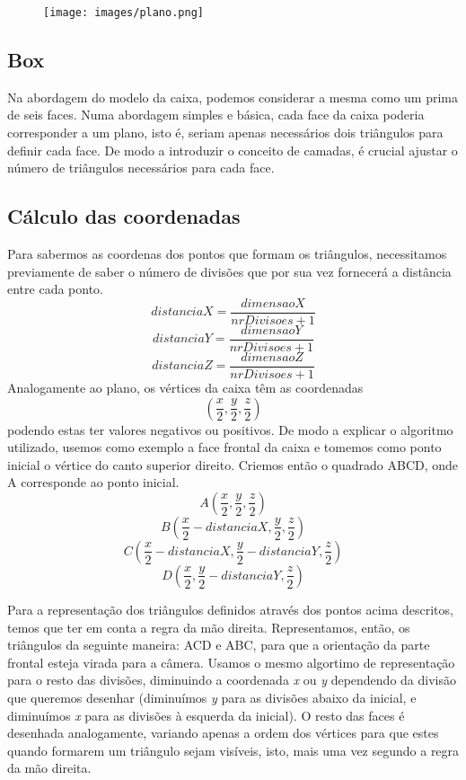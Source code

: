 \Huge\documentclass{article}
\begin{document}
\vspace{0.5cm}

\begin{figure}[h]
\centering
\texttt{[image: images/plano.png]}
\end{figure}

\subsection{Box}
Na abordagem do modelo da caixa, podemos considerar a mesma como um prima de seis faces. Numa abordagem simples e básica, cada face da caixa poderia corresponder a um plano, isto é, seriam apenas necessários dois triângulos para definir cada face. De modo a introduzir o conceito de camadas, é crucial ajustar o número de triângulos necessários para cada face.
\subsection{Cálculo das coordenadas}
Para sabermos as coordenas dos pontos que formam os triângulos, necessitamos previamente de saber o número de divisões que por sua vez fornecerá a distância entre cada ponto.
\[distanciaX = \frac{dimensaoX}{nrDivisoes + 1}\]
\[distanciaY = \frac{dimensaoY}{nrDivisoes + 1}\]
\[distanciaZ = \frac{dimensaoZ}{nrDivisoes + 1}\]
Analogamente ao plano, os vértices da caixa têm as coordenadas
\[(\frac{x}{2}, \frac{y}{2}, \frac{z}{2})\]
podendo estas ter valores negativos ou positivos. De modo a explicar o algoritmo utilizado, usemos como exemplo a face frontal da caixa e tomemos como ponto inicial o vértice do canto superior direito. Criemos então o quadrado ABCD, onde A corresponde ao ponto inicial.
\[A(\frac{x}{2}, \frac{y}{2}, \frac{z}{2})\]
\[B(\frac{x}{2} - distanciaX, \frac{y}{2}, \frac{z}{2})\]
\[C(\frac{x}{2} - distanciaX, \frac{y}{2} - distanciaY, \frac{z}{2})\]
\[D(\frac{x}{2}, \frac{y}{2} - distanciaY, \frac{z}{2})\]


Para a representação dos triângulos definidos através dos pontos acima descritos, temos que ter em conta a regra da mão direita. Representamos, então, os triângulos da seguinte maneira: ACD e ABC, para que a orientação da parte frontal esteja virada para a câmera. 
Usamos o mesmo algortimo de representação para o resto das divisões, diminuindo a coordenada \textit{x} ou \textit{y} dependendo da divisão que queremos desenhar (diminuímos \textit{y} para as divisões abaixo da inicial, e diminuímos \textit{x} para as divisões à esquerda da inicial).
O resto das faces é desenhada analogamente, variando apenas a ordem dos vértices para que estes quando formarem um triângulo sejam visíveis, isto, mais uma vez segundo a regra da mão direita. 
\end{document}
